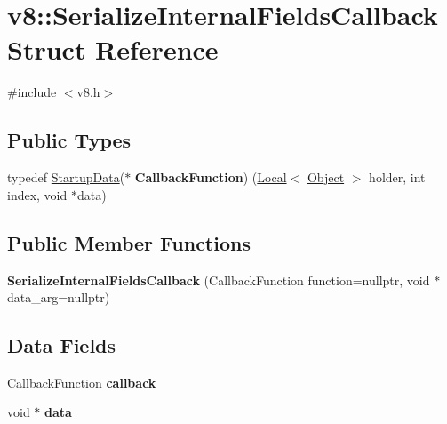 \hypertarget{structv8_1_1SerializeInternalFieldsCallback}{}\section{v8\+:\+:Serialize\+Internal\+Fields\+Callback Struct Reference}
\label{structv8_1_1SerializeInternalFieldsCallback}


{\ttfamily \#include $<$v8.\+h$>$}

\subsection*{Public Types}
\begin{DoxyCompactItemize}
\item 
\mbox{\label{structv8_1_1SerializeInternalFieldsCallback_a65e0231420540feb0211553b1821d508}} 
typedef \mbox{\hyperlink{classv8_1_1StartupData}{Startup\+Data}}($\ast$ {\bfseries Callback\+Function}) (\mbox{\hyperlink{classv8_1_1Local}{Local}}$<$ \mbox{\hyperlink{classv8_1_1Object}{Object}} $>$ holder, int index, void $\ast$data)
\end{DoxyCompactItemize}
\subsection*{Public Member Functions}
\begin{DoxyCompactItemize}
\item 
\mbox{\label{structv8_1_1SerializeInternalFieldsCallback_aa3c8fa9fa7f7eb7f87dbd5a96425bf32}} 
{\bfseries Serialize\+Internal\+Fields\+Callback} (Callback\+Function function=nullptr, void $\ast$data\+\_\+arg=nullptr)
\end{DoxyCompactItemize}
\subsection*{Data Fields}
\begin{DoxyCompactItemize}
\item 
\mbox{\label{structv8_1_1SerializeInternalFieldsCallback_ab4511f3840db60378b1f000478dac521}} 
Callback\+Function {\bfseries callback}
\item 
\mbox{\label{structv8_1_1SerializeInternalFieldsCallback_a8f92d651c3cba2afd9b8504bb3f40130}} 
void $\ast$ {\bfseries data}
\end{DoxyCompactItemize}


